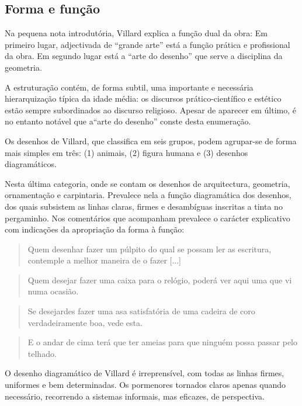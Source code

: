 \documentclass{article}
\begin{document}
\subsection{Forma e função}

Na pequena nota introdutória, Villard explica a função dual da obra:
Em primeiro lugar, adjectivada de ``grande arte'' está a função
prática e profissional da obra. Em segundo lugar está a ``arte do
desenho'' que serve a disciplina da geometria.

A estruturação contém, de forma subtil, uma importante e necessária
hierarquização típica da idade média: os discursos prático-científico
e estético estão sempre subordinados ao discurso religioso. Apesar de
aparecer em último, é no entanto notável que a``arte do desenho''
conste desta enumeração.

Os desenhos de Villard, que \cite{teresa} classifica em seis grupos,
podem agrupar-se de forma mais simples em três: (1) animais, (2)
figura humana e (3) desenhos diagramáticos.

Nesta última categoria, onde se contam os desenhos de arquitectura,
geometria, ornamentação e carpintaria. Prevalece nela a função
diagramática dos desenhos, dos quais subsistem as linhas claras,
firmes e desambíguas inscritas a tinta no pergaminho. Nos comentários
que acompanham prevalece o carácter explicativo com indicações da
apropriação da forma à função:

\begin{quote}
  Quem desenhar fazer um púlpito do qual se possam ler as escritura,
  contemple a melhor maneira de o fazer [...]  \cite{villard, p??}
\end{quote}

\begin{quote}
  Quem desejar fazer uma caixa para o relógio, poderá ver aqui uma
  que vi numa ocasião. \cite{villard, p??}
\end{quote}

\begin{quote} Se desejardes fazer uma asa satisfatória de uma cadeira
de coro verdadeiramente boa, vede esta. \cite{villard, p??}
\end{quote}

\begin{quote} E o andar de cima terá que ter ameias para que ninguém
  possa passar pelo telhado. \cite{villard, p??}
\end{quote}

O desenho diagramático de Villard é irreprensível, com todas as linhas
firmes, uniformes e bem determinadas. Os pormenores tornados claros
apenas quando necessário, recorrendo a sistemas informais, mas
eficazes, de perspectiva.
\end{document}
